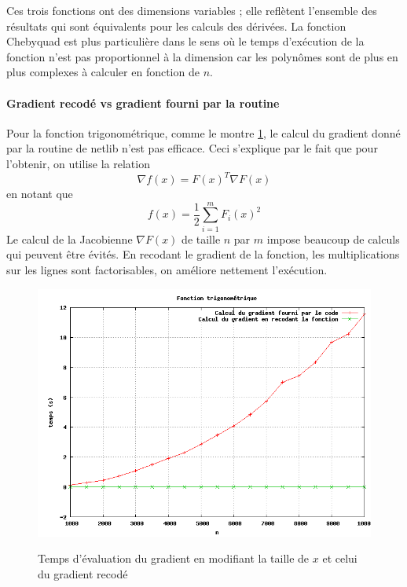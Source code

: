 Ces trois fonctions ont des dimensions variables ; elle refl\`etent l'ensemble des r\'esultats qui sont \'equivalents pour les calculs des d\'eriv\'ees.
La fonction Chebyquad est plus particuli\`ere dans le sens o\`u le temps d'ex\'ecution de la fonction n'est pas proportionnel
\`a la dimension car les polynômes sont de plus en plus complexes \`a calculer en fonction de $n$. 





\paragraph{Gradient recod\'e vs gradient fourni par la routine}
 Pour la fonction trigonom\'etrique, comme le montre \ref{fig:temps14},
 le calcul du gradient donn\'e par la routine de netlib n'est pas 
efficace. Ceci s'explique par le fait que pour l'obtenir, on utilise la relation $$ \nabla f(x)=F(x)^T\nabla F(x)$$ en notant que 
$$f(x)= \frac{1}{2}\sum_{i=1}^{m}F_i(x)^2$$
Le calcul de la Jacobienne $\nabla F(x)$ de taille $n$ par $m$ impose beaucoup de calculs qui peuvent être \'evit\'es.
En recodant le gradient de la fonction, les multiplications sur les lignes sont factorisables, on am\'eliore nettement 
l'ex\'ecution.

\begin{figure}
\caption{Temps d'\'evaluation du gradient en modifiant la taille
de $x$ et celui du gradient recod\'e}
\center
\includegraphics[scale=0.4]{figures/temps14.png}
\label{fig:temps14}
\end{figure}






